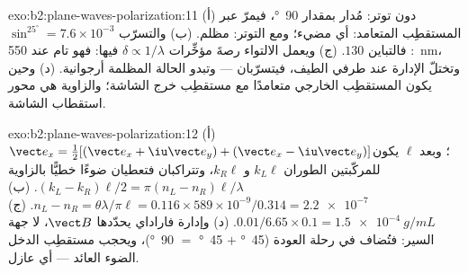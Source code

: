 \begin{solution}{exo:b2:plane-waves-polarization:11}
(أ) دون توتر: مُدار بمقدار \qty{90}{\degree}، فيمرّ عبر المستقطِب المتعامد:
أي مضيء؛ ومع التوتر: مظلم. (ب) والتسرّب $\sin^25^\circ = 7.6 \times 10^{-3}$: فالتباين
$130$. (ج) ويعمل الالتواء رصةَ مؤخِّرات $\delta \propto 1/\lambda$ فيها:
فهو تام عند \qty{550}{nm}، وتختلّ الإدارة عند طرفي الطيف،
فيتسرّبان --- وتبدو الحالة المظلمة أرجوانية. (د) وحين يكون المستقطِب
الخارجي متعامدًا مع مستقطِب خرج الشاشة؛ والزاوية هي
محور استقطاب الشاشة.
\end{solution}

\begin{solution}{exo:b2:plane-waves-polarization:12}
(أ) $\vect e_x = \tfrac12[(\vect e_x + \iu\vect e_y) + (\vect e_x - \iu\vect e_y)]$؛ وبعد $\ell$
يكون للمركّبتين الطوران $k_L\ell$ و $k_R\ell$، وتتراكبان فتعطيان
ضوءًا خطيًّا بالزاوية $(k_L - k_R)\ell/2 = \pi(n_L - n_R)\ell/\lambda$. (ب) $n_L -
n_R = \theta\lambda/\pi\ell = 0.116 \times 589 \times 10^{-9}/0.314 = \qty{2.2e-7}{}$. (ج)
$0.01/6.65 \times 0.1 = \qty{1.5e-4}{g/mL}$. (د) وإدارة فاراداي يحدّدها
$\vect B$، لا جهة السير: فتُضاف في رحلة العودة
(\qty{45}{\degree} $+$ \qty{45}{\degree} $=$ \qty{90}{\degree})، ويحجب مستقطِب الدخل
الضوء العائد --- أي عازل.
\end{solution}

